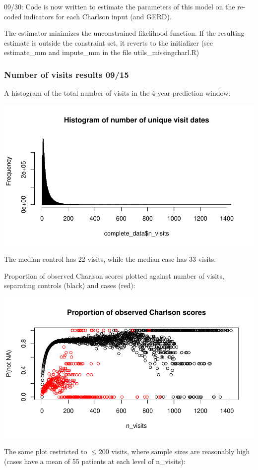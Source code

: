 \documentclass[12pt]{article}
\begin{document}
09/30: Code is now written to estimate the parameters of this model on the re-coded indicators for each Charlson input (and GERD).

The estimator minimizes the unconstrained likelihood function. If the resulting estimate is outside the constraint set, it reverts to the initializer (see estimate\_mm and impute\_mm in the file utils\_missingcharl.R)

\subsubsection*{Number of visits results 09/15}

A histogram of the total number of visits in the 4-year prediction window:

\begin{center}
\includegraphics[width=.7\textwidth]{nvisits_hist.pdf}
\end{center}

The median control has 22 visits, while the median case has 33 visits.

Proportion of observed Charlson scores plotted against number of visits, separating controls (black) and cases (red):

\begin{center}
\includegraphics[width=.6\textwidth]{nvisits_scatter.pdf}
\end{center}

The same plot restricted to $\leq 200$ visits, where sample sizes are reasonably high (cases have a mean of 55 patients at each level of n\_visits):
\end{document}
